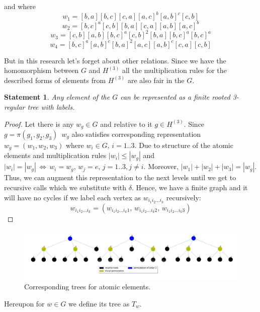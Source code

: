 \documentclass[a4paper,12pt]{amsart}
\newtheorem{statement}{Statement}
\begin{document}
and where 
$$ w_1 = [b, a][b, c][c, a][a, c]^b[a, b]^c[c, b] $$
$$ w_2 = [b, c]^a[c, b][b, a][c, a][a, b][a, c]^b $$
$$ w_3 = [c, b][a, b][b, c]^a[c, b]^2[b, a][b, c]^a[b, c]^a $$
$$ w_4 = [b, c]^a[a, b]^c[b, a]^2[a, c][a, b]^c[c, a][c, b] $$

But in this research let's forget about other relations. Since we have the homomorphism 
between $G$ and $H^{(3)}$ all the multiplication rules for the described forms of elements
from $H^{(3)}$ are also fair in the $G$. 
\\

\begin{statement}
	Any element of the $G$ can be represented as a finite rooted 3-regular tree with labels.
\end{statement}

\begin{proof}
	
	Let there is any $w_g \in G$ and relative to it $g \in H^{(3)}$. Since $g = \pi (g_1, g_2, g_3)\,$ 
	$w_g$ also satisfies corresponding representation $w_g = (w_1, w_2, w_3)$ where $w_i \in G, \, i = 1..3$.
	Due to structure of the atomic elements and multiplication rules $|w_i| \le |w_g|$ and  
	$|w_i| = |w_g| \, \Leftrightarrow \, w_i = w_g, \, w_j = e, \, j = 1..3, j \ne i$. 
	Moreover, $|w_1| + |w_2| + |w_3| = |w_g|$. Thus, we can augment this representation to the next 
	levels until we get to recursive calls which we substitute with $\delta$. Hence, we have a finite 
	graph and it will have no cycles if we label each vertex as $w_{i_1 i_2 ... i_k}$ recursively:
	$$
	w_{i_1 i_2 ... i_k} = (w_{i_1 i_2 ... i_k 1},\, w_{i_1 i_2 ... i_k 2},\, w_{i_1 i_2 ... i_k 3})
	$$
	
	
	
\end{proof}


\begin{figure}[h]
	\centering
	\includegraphics[scale=0.13]{../graphs/a_b_c.png}
	\caption{Corresponding trees for atomic elements.}
	\label{a_b_c}	
\end{figure}

Hereupon for $w \in G$ we define its tree as $T_w$.
\end{document}
